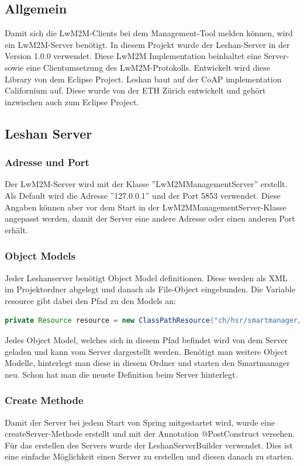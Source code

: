 \subsection{Allgemein}
Damit sich die LwM2M-Clients bei dem Management-Tool melden können, wird ein LwM2M-Server benötigt. In diesem Projekt wurde der Leshan-Server in der Version 1.0.0 verwendet. Diese LwM2M Implementation beinhaltet eine Server- sowie eine Clientumsetzung des LwM2M-Protokolls. Entwickelt wird diese Library von dem Eclipse Project. Leshan baut auf der CoAP implementation Californium auf. Diese wurde von der ETH Zürich entwickelt und  gehört inzwischen auch zum Eclipse Project.

\subsection{Leshan Server}
\subsubsection{Adresse und Port}
Der LwM2M-Server wird mit der Klasse ''LwM2MManagementServer'' erstellt. Als Default wird die Adresse ''127.0.0.1'' und der Port 5853 verwendet. Diese Angaben können aber vor dem Start in der LwM2MManagementServer-Klasse angepasst werden, damit der Server eine andere Adresse oder einen anderen Port erhält.
\subsubsection{Object Models}
Jeder Leshanserver benötigt Object Model definitionen. Diese werden als XML im Projektordner abgelegt und danach als File-Object eingebunden.
Die Variable resource gibt dabei den Pfad zu den Models an:
\begin{lstlisting}[language=java]
private Resource resource = new ClassPathResource("ch/hsr/smartmanager/resources/models/");
\end{lstlisting}
Jedes Object Model, welches sich in diesem Pfad befindet wird von dem Server geladen und kann vom Server dargestellt werden. Benötigt man weitere Object Modelle, hinterlegt man diese in diesem Ordner und starten den Smartmanager neu. Schon hat man die neuste Definition beim Server hinterlegt.
\subsubsection{Create Methode}
Damit der Server bei jedem Start von Spring mitgestartet wird, wurde eine createServer-Methode erstellt und mit der Annotation @PostConstruct versehen. Für das erstellen des Servers wurde der LeshanServerBuilder verwendet. Dies ist eine einfache Möglichkeit einen Server zu erstellen und diesen danach zu starten.

